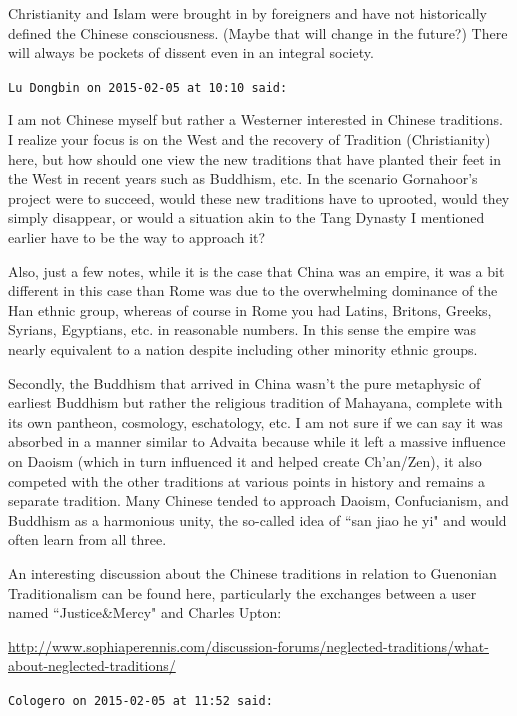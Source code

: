 \begin{footnotesize}
\begin{sffamily}
Christianity and Islam were brought in by foreigners and have not historically defined the Chinese consciousness. (Maybe that will change in the future?) There will always be pockets of dissent even in an integral society.


\hfill

\texttt{Lu Dongbin on 2015-02-05 at 10:10 said: }

I am not Chinese myself but rather a Westerner interested in Chinese traditions. I realize your focus is on the West and the recovery of Tradition (Christianity) here, but how should one view the new traditions that have planted their feet in the West in recent years such as Buddhism, etc. In the scenario Gornahoor's project were to succeed, would these new traditions have to uprooted, would they simply disappear, or would a situation akin to the Tang Dynasty I mentioned earlier have to be the way to approach it?

Also, just a few notes, while it is the case that China was an empire, it was a bit different in this case than Rome was due to the overwhelming dominance of the Han ethnic group, whereas of course in Rome you had Latins, Britons, Greeks, Syrians, Egyptians, etc. in reasonable numbers. In this sense the empire was nearly equivalent to a nation despite including other minority ethnic groups.

Secondly, the Buddhism that arrived in China wasn't the pure metaphysic of earliest Buddhism but rather the religious tradition of Mahayana, complete with its own pantheon, cosmology, eschatology, etc. I am not sure if we can say it was absorbed in a manner similar to Advaita because while it left a massive influence on Daoism (which in turn influenced it and helped create Ch'an/Zen), it also competed with the other traditions at various points in history and remains a separate tradition. Many Chinese tended to approach Daoism, Confucianism, and Buddhism as a harmonious unity, the so-called idea of ``san jiao he yi" and would often learn from all three.

An interesting discussion about the Chinese traditions in relation to Guenonian Traditionalism can be found here, particularly the exchanges between a user named ``Justice\&Mercy" and Charles Upton:

\url{http://www.sophiaperennis.com/discussion-forums/neglected-traditions/what-about-neglected-traditions/}


\hfill

\texttt{Cologero on 2015-02-05 at 11:52 said: }


\end{sffamily}
\end{footnotesize}
